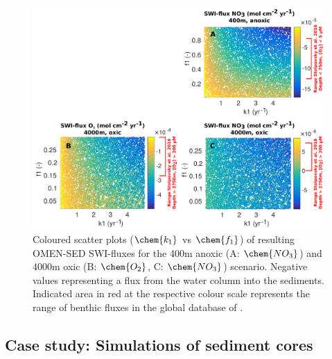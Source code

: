 \documentclass[gmd, manuscript]{copernicus}
\begin{document}
\begin{figure}[htbp]
\begin{center}
	\includegraphics[width=1.0\textwidth]{figures/SA/k1_vs_f1_SWIflux_COMBINED_1604.pdf}
	\caption{Coloured scatter plots ($\chem{k_1}$ vs $\chem{f_1}$) of resulting OMEN-SED SWI-fluxes for the 400m anoxic (A: $\chem{NO_3}$) and 4000m oxic (B: $\chem{O_2}$, C: $\chem{NO_3}$) scenario. 
	Negative values representing a flux from the water column into the sediments.
	Indicated area in red at the respective colour scale represents the range of benthic fluxes in the global database of \citet{bohlen_simple_2012}. 
}\label{fig:SA_Color_ScatterPlots}
\end{center}
\end{figure}


\subsection{Case study: Simulations of sediment cores}\label{subsec:SedProfiles}
\end{document}
